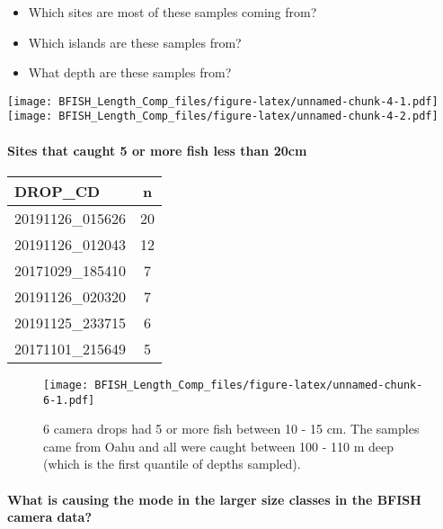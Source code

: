 \documentclass[
]{article}
\providecommand{\tightlist}{%
  \setlength{\itemsep}{0pt}\setlength{\parskip}{0pt}}
\begin{document}
\begin{itemize}
\tightlist
\item
  Which sites are most of these samples coming from?
\item
  Which islands are these samples from?\\
\item
  What depth are these samples from?
\end{itemize}

\texttt{[image: BFISH\_Length\_Comp\_files/figure-latex/unnamed-chunk-4-1.pdf]}
\texttt{[image: BFISH\_Length\_Comp\_files/figure-latex/unnamed-chunk-4-2.pdf]}

\hypertarget{sites-that-caught-5-or-more-fish-less-than-20cm}{%
\paragraph{Sites that caught 5 or more fish less than
20cm}\label{sites-that-caught-5-or-more-fish-less-than-20cm}}

\captionsetup[table]{labelformat=empty,skip=1pt}
\begin{longtable}{lc}
\toprule
DROP\_CD & n \\ 
\midrule
20191126\_015626 & 20 \\ 
20191126\_012043 & 12 \\ 
20171029\_185410 & 7 \\ 
20191126\_020320 & 7 \\ 
20191125\_233715 & 6 \\ 
20171101\_215649 & 5 \\ 
\bottomrule
\end{longtable}

\begin{figure}
\centering
\texttt{[image: BFISH\_Length\_Comp\_files/figure-latex/unnamed-chunk-6-1.pdf]}
\caption{6 camera drops had 5 or more fish between 10 - 15 cm. The
samples came from Oahu and all were caught between 100 - 110 m deep
(which is the first quantile of depths sampled).}
\end{figure}

\hypertarget{what-is-causing-the-mode-in-the-larger-size-classes-in-the-bfish-camera-data}{%
\paragraph{What is causing the mode in the larger size classes in the
BFISH camera
data?}\label{what-is-causing-the-mode-in-the-larger-size-classes-in-the-bfish-camera-data}}
\end{document}
